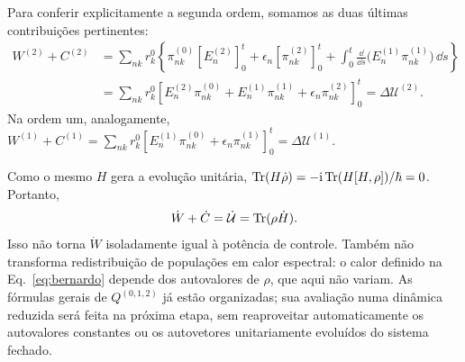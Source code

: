 Para conferir explicitamente a segunda ordem, somamos as duas últimas
contribuições pertinentes:
\begin{align}
 W^{(2)}+C^{(2)}
 &=\sum_{nk}r_k^0\left\{
 \pi_{nk}^{(0)}[E_n^{(2)}]_0^t
 +\epsilon_n[\pi_{nk}^{(2)}]_0^t
 +\int_0^t\frac{\dd}{\dd s}
       \big(E_n^{(1)}\pi_{nk}^{(1)}\big)\,\dd s\right\}\nonumber\\
 &=\sum_{nk}r_k^0
 \left[E_n^{(2)}\pi_{nk}^{(0)}
       +E_n^{(1)}\pi_{nk}^{(1)}
       +\epsilon_n\pi_{nk}^{(2)}\right]_0^t
 =\Delta\mathcal U^{(2)}.
 \label{eq:unitarycheck}
\end{align}
Na ordem um, analogamente,
$W^{(1)}+C^{(1)}
=\sum_{nk}r_k^0[E_n^{(1)}\pi_{nk}^{(0)}
+\epsilon_n\pi_{nk}^{(1)}]_0^t
=\Delta\mathcal U^{(1)}$.

Como o mesmo $H$ gera a evolução unitária,
$\operatorname{Tr}(H\dot\rho)=-\mathrm i\operatorname{Tr}(H[H,\rho])/\hbar=0$.
Portanto,
\begin{equation}
 \dot W+\dot C=\dot{\mathcal U}=\operatorname{Tr}(\rho\dot H).
 \label{eq:drivingpower}
\end{equation}
Isso não torna $\dot W$ isoladamente igual à potência de controle.
Também não transforma redistribuição de populações em calor espectral:
o calor definido na Eq.~\eqref{eq:bernardo} depende dos autovalores de
$\rho$, que aqui não variam. As fórmulas gerais de $Q^{(0,1,2)}$
já estão organizadas; sua avaliação numa dinâmica reduzida será feita
na próxima etapa, sem reaproveitar automaticamente os autovalores
constantes ou os autovetores unitariamente evoluídos do sistema fechado.
